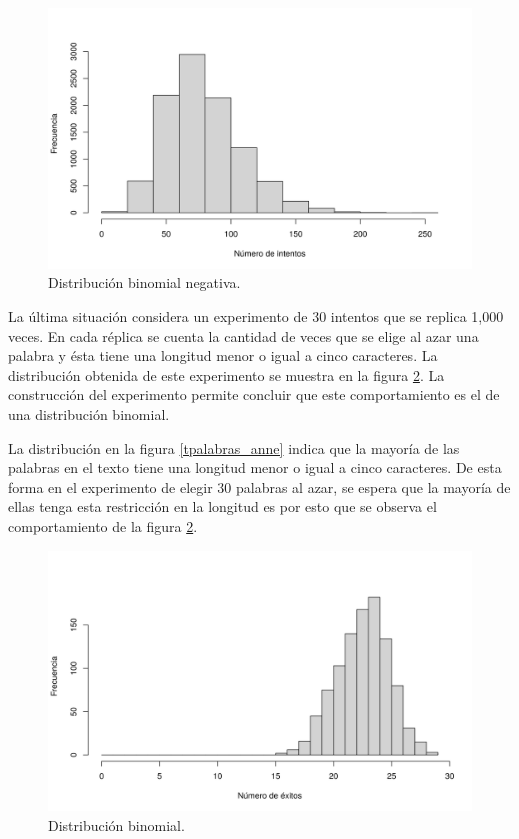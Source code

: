 \documentclass[12pt]{article}
\begin{document}
	\begin{figure}
		\centering
		\includegraphics[scale=0.6]{bin_neg_t7.png}
		\caption{Distribución binomial negativa.}
		\label{bin_neg_t7}
	\end{figure}
	
	La última situación considera un experimento de 30 intentos que se replica 1,000 veces. En cada réplica se cuenta la cantidad de veces que se elige al azar una palabra y ésta tiene una longitud menor o igual a cinco caracteres. La distribución obtenida de este experimento se muestra en la figura \ref{bin_5}. La construcción del experimento permite concluir que este comportamiento es el de una distribución binomial.
	
	La distribución en la figura \ref{tpalabras_anne} indica que la mayoría de las palabras en el texto tiene una longitud menor o igual a cinco caracteres. De esta forma en el experimento de elegir 30 palabras al azar, se espera que la mayoría de ellas tenga esta restricción en la longitud es por esto que se observa el comportamiento de la figura \ref{bin_5}. 
	
	\begin{figure}
		\centering
		\includegraphics[scale=0.6]{bin_5.png}
		\caption{Distribución binomial.}
		\label{bin_5}
	\end{figure}
	


\end{document}
